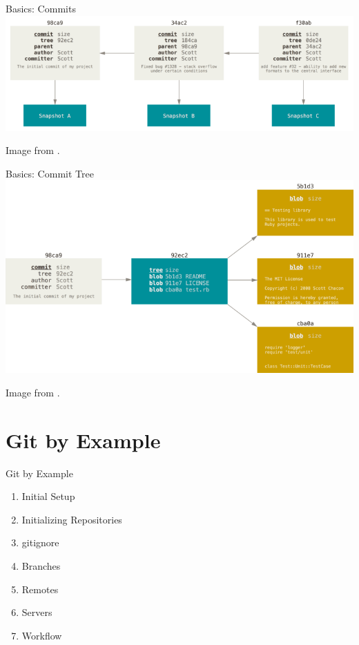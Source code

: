 \documentclass[aspectratio=169,fleqn]{beamer}
\begin{document}
  \begin{frame}{Basics: Commits}
    \centering
    \includegraphics[width=\linewidth]{images/commits-and-parents.png}

    {\scriptsize Image from \textcite{pro-git}.}
  \end{frame}

  \begin{frame}{Basics: Commit Tree}
    \centering
    \includegraphics[height=0.8\textheight]{images/commit-and-tree.png}

    {\scriptsize Image from \textcite{pro-git}.}
  \end{frame}


\section{Git by Example} %
\label{sec:git_by_example}

  \begin{frame}{Git by Example}
    \begin{enumerate}
      \item Initial Setup
      \item Initializing Repositories
      \item gitignore
      \item Branches
      \item Remotes
      \item Servers
      \item Workflow
    \end{enumerate}
  \end{frame}
\end{document}
